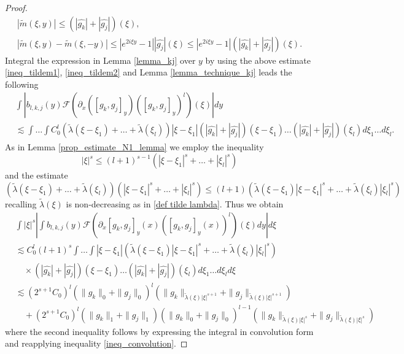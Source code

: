 \documentclass[11pt]{article}
\newcommand{\m}{\tilde{m}}
\newcommand{\tla}{\tilde{\lambda}}
\theoremstyle{definition}
\numberwithin{equation}{section}
\begin{document}
\begin{proof}
\begin{gather}
    |\m(\xi,y)|\leq(|\hat{g_k}|+|\hat{g_j}|)(\xi)\label{ineq_tildem1},\\
    |\m(\xi,y)-\m(\xi,-y)|\leq |e^{2i\xi y}-1||\hat{g_j}|(\xi)\leq|e^{2i\xi y}-1|(|\hat{g_k}|+|\hat{g_j}|)(\xi)\label{ineq_tildem2}.
\end{gather}
Integral the expression in Lemma \ref{lemma_kj} over $y$ by using the above estimate 
\eqref{ineq_tildem1}, \eqref{ineq_tildem2} and Lemma \ref{lemma_technique_kj} leads the following
\begin{align}
    &\int|b_{l,k,j}(y)\mathscr{F}(\partial_x([g_k,g_j]_y)([g_k,g_j]_y)^l)(\xi)|dy\\
    &\lesssim\int\dots\int  C_0^l(\tla(\xi-\xi_1)+\dots+\tla(\xi_l))|\xi-\xi_1|(|\hat{g_k}|+|\hat{g_j}|)(\xi-\xi_1)\dots(|\hat{g_k}|+|\hat{g_j}|)(\xi_l)d\xi_1\dots d\xi_l.
\end{align}
As in Lemma \ref{prop_estimate_N1_lemma} we employ the inequality
\begin{equation}
    |\xi|^s\leq(l+1)^{s-1}(|\xi-\xi_1|^s+\dots+|\xi_l|^s)
\end{equation}
and the estimate
\begin{equation}
    (\tla(\xi-\xi_1)+\dots+\tla(\xi_l))(|\xi-\xi_1|^s+\dots+|\xi_l|^s)\leq(l+1)(\tla(\xi-\xi_1)|\xi-\xi_1|^s+\dots+\tla(\xi_l)|\xi_l|^s)
\end{equation}
recalling $\tla(\xi)$ is non-decreasing as in \eqref{def tilde lambda}. Thus we obtain
\begin{align}
    &\int|\xi|^s\left|\int b_{l,k,j}(y)\mathscr{F}(\partial_x[g_k,g_j]_y(x)([g_k,g_j]_y(x))^l)(\xi)dy\right|d\xi\\
        &\lesssim C_0^l(l+1)^s\int\dots\int|\xi-\xi_1|(\tla(\xi-\xi_1)|\xi-\xi_1|^s+\dots+\tla(\xi_l)|\xi_l|^s)\\
        &\quad\times(|\hat{g_k}|+|\hat{g_j}|)(\xi-\xi_1)\dots(|\hat{g_k}|+|\hat{g_j}|)(\xi_l)d\xi_1\dots d\xi_ld\xi\\        
        & \lesssim (2^{s+1}C_0)^l(\|g_k\|_0+\|g_j\|_0)^l(\|g_k\|_{\tla(\xi)|\xi|^{s+1}}+\|g_j\|_{\tla(\xi)|\xi|^{s+1}})\\
        &\quad+(2^{s+1}C_0)^l(\|g_k\|_1+\|g_j\|_1)(\|g_k\|_0+\|g_j\|_0)^{l-1}(\|g_k\|_{\tla(\xi)|\xi|^{s}}+\|g_j\|_{\tla(\xi)|\xi|^{s}})
\end{align}
where the second inequality follows by expressing the integral in convolution form and reapplying inequality \eqref{ineq_convolution}.
\end{proof}
\end{document}
